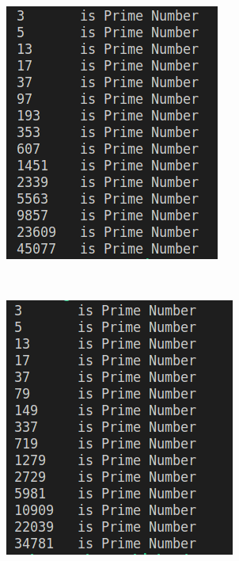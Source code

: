 \documentclass[xelatex, 11pt, a4paper, ja=standard]{bxjsarticle}
\begin{document}
\begin{figure}[htbp]
\begin{minipage}[b]{0.4\textwidth}
        \includegraphics[width=\textwidth]{./image/primeGenerator_2.png}
        \label{fig:./image/primeGenerator_2.png}
    \end{minipage}
    \\
    \begin{minipage}[b]{0.4\textwidth}
        \includegraphics[width=\textwidth]{./image/primeGenerator_3.png}

\end{minipage}
\end{figure}
\end{document}
